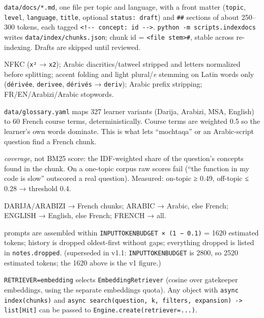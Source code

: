 \documentclass[11pt,a4paper]{article}
\renewcommand{\_}{\origus\allowbreak}
\begin{document}
\begin{description}[style=nextline, leftmargin=0.6cm, font=\sffamily\bfseries\color{navy}]
  \item[Course documents] \texttt{data/docs/*.md}, one file per topic and language, with a front matter
  (\texttt{topic}, \texttt{level}, \texttt{language}, \texttt{title}, optional \texttt{status: draft}) and \texttt{\#\#} sections
  of about 250–300 tokens, each tagged \texttt{<!-{}- concept: id -{}->}. \texttt{python -m scripts.index\_docs}
  writes \texttt{data/index/chunks.json}; chunk id = \texttt{<file stem>\#<section slug>}, stable across
  re-indexing. Drafts are skipped until reviewed.
  \item[Tokenization] NFKC (\texttt{x²} → \texttt{x2}); Arabic diacritics/tatweel stripped and letters normalized
  before splitting; accent folding and light plural/\textit{e} stemming on Latin words only
  (\texttt{dérivée}, \texttt{derivee}, \texttt{dérivés} → \texttt{deriv}); Arabic prefix stripping; FR/EN/Arabizi/Arabic stopwords.
  \item[Glossary] \texttt{data/glossary.yaml} maps 327 learner variants (Darija, Arabizi, MSA, English) to 60
  French course terms, deterministically. Course terms are weighted 0.5 so the learner's own words
  dominate. This is what lets ``mochtaqa'' or an Arabic-script question find a French chunk.
  \item[Relevance gate] \emph{coverage}, not BM25 score: the IDF-weighted share of the question's
  concepts found in the chunk. On a one-topic corpus raw scores fail (``the function in my code is
  slow'' outscored a real question). Measured: on-topic ≥ 0.49, off-topic ≤ 0.28 → threshold 0.4.
  \item[Language plan] DARIJA/ARABIZI → French chunks; ARABIC → Arabic, else French; ENGLISH →
  English, else French; FRENCH → all.
  \item[Budget] prompts are assembled within \texttt{INPUT\_TOKEN\_BUDGET × (1 − 0.1)} = 1620 estimated
  tokens; history is dropped oldest-first without gaps; everything dropped is listed in \texttt{notes.dropped}. (superseded in v1.1: \texttt{INPUT\_TOKEN\_BUDGET} is 2800, so 2520 estimated tokens; the 1620 above is the v1 figure.)
\end{description}

\begin{idea}
\texttt{RETRIEVER=embedding} selects \texttt{EmbeddingRetriever} (cosine over gatekeeper embeddings, using
the separate embeddings quota). Any object with \texttt{async index(chunks)} and
\texttt{async search(question, k, filters, expansion) -> list[Hit]} can be passed to \texttt{Engine.create(retriever=...)}.
\end{idea}
\end{document}
